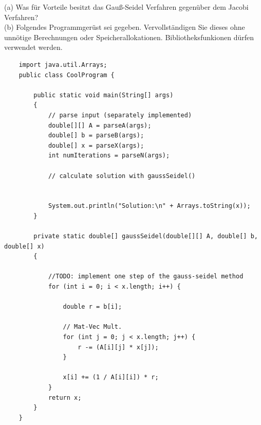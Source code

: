 \documentclass{scrartcl}
\begin{document}
	(a) 
	Was für Vorteile besitzt das Gauß-Seidel Verfahren gegenüber dem Jacobi Verfahren?
	\lbreak
	\\
	(b)
	Folgendes Programmgerüst sei gegeben. Vervollständigen Sie dieses ohne unnötige Berechnungen oder Speicherallokationen. Bibliotheksfunkionen dürfen  verwendet werden.
	\begin{lstlisting}
	import java.util.Arrays;
	public class CoolProgram {
			
		public static void main(String[] args) 
		{
			// parse input (separately implemented)
			double[][] A = parseA(args); 
			double[] b = parseB(args);
			double[] x = parseX(args);
			int numIterations = parseN(args);
				
			// calculate solution with gaussSeidel()
				
				
			System.out.println("Solution:\n" + Arrays.toString(x));
		}
			
		private static double[] gaussSeidel(double[][] A, double[] b, double[] x) 
		{
			
			//TODO: implement one step of the gauss-seidel method
			for (int i = 0; i < x.length; i++) {
			
				double r = b[i];
				
				// Mat-Vec Mult.
				for (int j = 0; j < x.length; j++) {
					r -= (A[i][j] * x[j]);
				}
				
				x[i] += (1 / A[i][i]) * r;
			}
			return x;
		}
	}
	\end{lstlisting}
\end{document}
